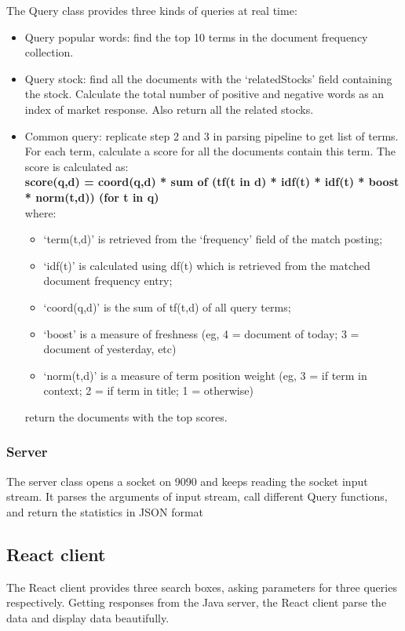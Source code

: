 \documentclass{article}
\begin{document}
The Query class provides three kinds of queries at real time: 
\begin{itemize}
  \item Query popular words: find the top 10 terms in the document frequency collection. 
  \item Query stock: find all the documents with the `relatedStocks' field containing the stock. Calculate the total number of positive and negative words as an index of market response. Also return all the related stocks.
  \item Common query: replicate step 2 and 3 in parsing pipeline to get list of terms. For each term, calculate a score for all the documents contain this term. The score is calculated as:\\
  \textbf{score(q,d) = coord(q,d) * sum of (tf(t in d) * idf(t) * idf(t) * boost * norm(t,d)) (for t in q)} \\
  where:
  \begin{itemize}
    \item `term(t,d)' is retrieved from the `frequency' field of the match posting; 
    \item `idf(t)' is calculated using df(t) which is retrieved from the matched document frequency entry; 
    \item `coord(q,d)' is the sum of tf(t,d) of all query terms; 
    \item `boost' is a measure of freshness (eg, 4 = document of today; 3 = document of yesterday, etc)
    \item `norm(t,d)' is a measure of term position weight (eg, 3 = if term in context; 2 = if term in title; 1 = otherwise)
  \end{itemize}
  return the documents with the top scores.
\end{itemize}

\subsubsection{Server}
The server class opens a socket on 9090 and keeps reading the socket input stream. It parses the arguments of input stream, call different Query functions, and return the statistics in JSON format

\subsection{React client}
The React client provides three search boxes, asking parameters for three queries respectively. Getting responses from the Java server, the React client parse the data and display data beautifully. 
\end{document}
